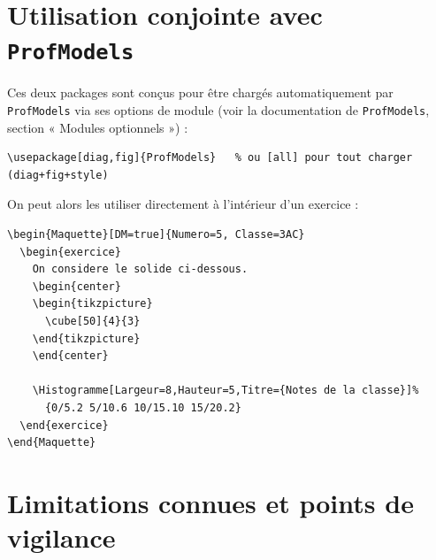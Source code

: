 \documentclass[11pt,a4paper]{article}
\begin{document}
\section{Utilisation conjointe avec \texttt{ProfModels}}

Ces deux packages sont conçus pour être chargés automatiquement par \texttt{ProfModels} via ses options de module (voir la documentation de \texttt{ProfModels}, section « Modules optionnels ») :

\begin{lstlisting}
\usepackage[diag,fig]{ProfModels}   % ou [all] pour tout charger (diag+fig+style)
\end{lstlisting}

On peut alors les utiliser directement à l'intérieur d'un exercice :

\begin{lstlisting}
\begin{Maquette}[DM=true]{Numero=5, Classe=3AC}
  \begin{exercice}
    On considere le solide ci-dessous.
    \begin{center}
    \begin{tikzpicture}
      \cube[50]{4}{3}
    \end{tikzpicture}
    \end{center}

    \Histogramme[Largeur=8,Hauteur=5,Titre={Notes de la classe}]%
      {0/5.2 5/10.6 10/15.10 15/20.2}
  \end{exercice}
\end{Maquette}
\end{lstlisting}

\section{Limitations connues et points de vigilance}
\end{document}
